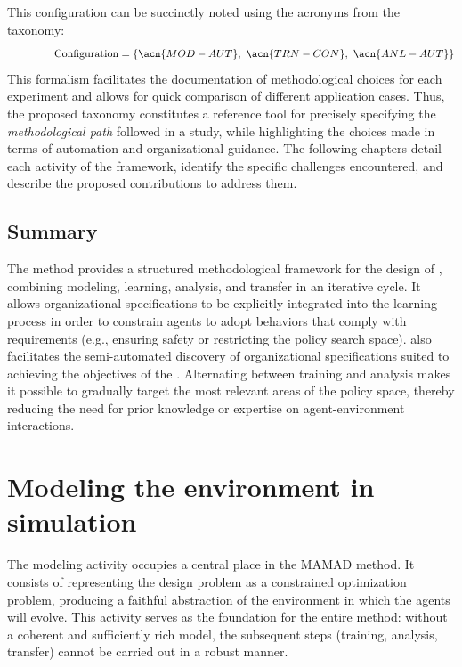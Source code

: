 This configuration can be succinctly noted using the acronyms from the taxonomy:
\[
  \hspace{1.5cm}\text{Configuration} = \{\acn{MOD-AUT},\ \acn{TRN-CON},\ \acn{ANL-AUT}\}
\]
This formalism facilitates the documentation of methodological choices for each experiment and allows for quick comparison of different application cases.
%
Thus, the proposed taxonomy constitutes a reference tool for precisely specifying the \textit{methodological path} followed in a study, while highlighting the choices made in terms of automation and organizational guidance.
The following chapters detail each activity of the  framework, identify the specific challenges encountered, and describe the proposed contributions to address them.

\section{Summary}
The  method provides a structured methodological framework for the design of , combining modeling, learning, analysis, and transfer in an iterative cycle. It allows organizational specifications to be explicitly integrated into the learning process in order to constrain agents to adopt behaviors that comply with requirements (e.g., ensuring safety or restricting the policy search space).  also facilitates the semi-automated discovery of organizational specifications suited to achieving the objectives of the . Alternating between training and analysis makes it possible to gradually target the most relevant areas of the policy space, thereby reducing the need for prior knowledge or expertise on agent-environment interactions.

\clearpage
\thispagestyle{empty}
\null
\newpage


\chapter{Modeling the environment in simulation}
\label{chap:modeling}

The modeling activity occupies a central place in the MAMAD method.
It consists of representing the design problem as a constrained optimization problem, producing a faithful abstraction of the environment in which the agents will evolve.
This activity serves as the foundation for the entire method: without a coherent and sufficiently rich model, the subsequent steps (training, analysis, transfer) cannot be carried out in a robust manner.

